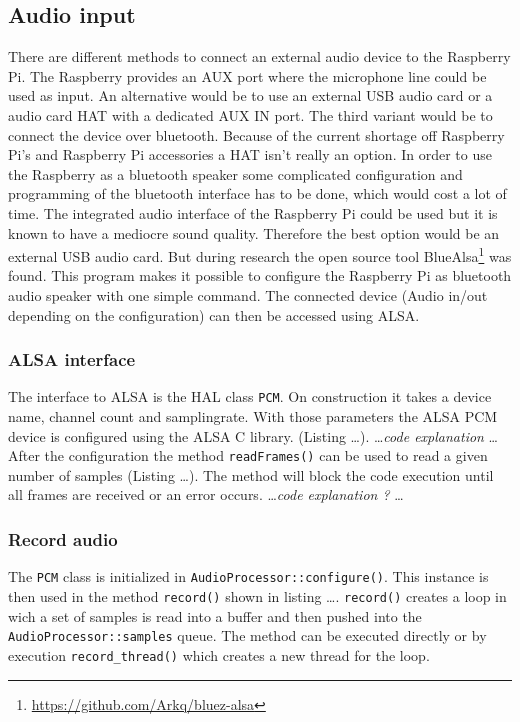 \subsection{Audio input}\label{sec:software:rec}
%
There are different methods to connect an external audio device to the Raspberry Pi. The Raspberry provides an AUX port where the microphone line could be used as input. An alternative would be to use an external USB audio card or a audio card HAT with a dedicated AUX IN port. The third variant would be to connect the device over bluetooth.\p
%
Because of the current shortage off Raspberry Pi's and Raspberry Pi accessories a HAT isn't really an option. In order to use the Raspberry as a bluetooth speaker some complicated configuration and programming of the bluetooth interface has to be done, which would cost a lot of time. The integrated audio interface of the Raspberry Pi could be used but it is known to have a mediocre sound quality. Therefore the best option would be an external USB audio card. But during research the open source tool BlueAlsa\footnote{\href{https://github.com/Arkq/bluez-alsa}{https://github.com/Arkq/bluez-alsa}} was found. This program makes it possible to configure the Raspberry Pi as bluetooth audio speaker with one simple command. The connected device (Audio in/out depending on the configuration) can then be accessed using ALSA.
%
\subsubsection*{ALSA interface}

The interface to ALSA is the HAL class \lstinline{PCM}. On construction it takes a device name, channel count and samplingrate. With those parameters the ALSA PCM device is configured using the ALSA C library. (Listing \dots).\p
%
\dots \textit{code explanation} \dots\p
%
After the configuration the method \lstinline{readFrames()} can be used to read a given number of samples (Listing \dots). The method will block the code execution until all frames are received or an error occurs.
%
\dots \textit{code explanation ?} \dots
%
\subsubsection*{Record audio}
%
The \lstinline{PCM} class is initialized in \lstinline{AudioProcessor::configure()}. This instance is then used in the method \lstinline{record()} shown in listing \dots. \lstinline{record()} creates a loop in wich a set of samples is read into a buffer and then pushed into the \lstinline{AudioProcessor::samples} queue. The method can be executed directly or by execution \lstinline{record_thread()} which creates a new thread for the loop.